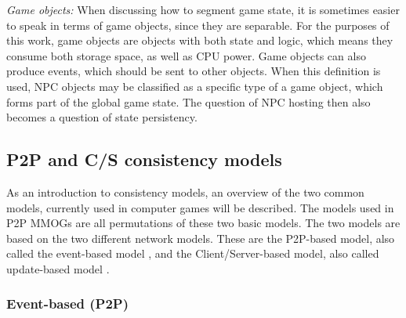 \documentclass[10pt,a4paper,journal,cspaper,compsoc]{IEEEtran}
\begin{document}
\emph{Game objects:} When discussing how to segment game state, it is sometimes easier to speak in terms of game objects, since they are
    separable. For the purposes of this work, game objects are objects with both state and logic, which means they consume both storage
    space, as well as CPU power. Game objects can also produce events, which should be sent to other objects. When this definition is used,
    NPC objects may be classified as a specific type of a game object, which forms part of the global game state. The question of NPC hosting
    then also becomes a question of state persistency.



\subsection{P2P and C/S consistency models}
\label{p2p_cs_models}

As an introduction to consistency models, an overview of the two common models, currently used in computer games will be described. The models used
in P2P MMOGs are all permutations of these two basic models. The two models are based on the two different network models. These are the P2P-based
model, also called the event-based model \cite{p2p_cm_aoe}, and the Client/Server-based model, also called update-based model
\cite{unreal_networking}.

\subsubsection{Event-based (P2P)}
\end{document}
